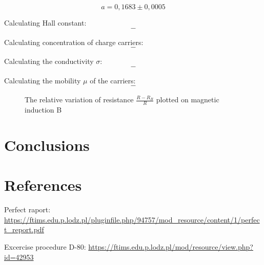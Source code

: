 \documentclass[a4paper,12pt]{article}
\begin{document}
\begin{equation*}
a = 0,1683 \pm 0,0005
\end{equation*}

Calculating Hall constant:
\begin{equation*}
-
\end{equation*}

Calculating concentration of charge carriers:
\begin{equation*}
-
\end{equation*}

Calculating the conductivity $\sigma$:
\begin{equation*}
-
\end{equation*}

Calculating the mobility $\mu$ of the carriers:
\begin{equation*}
-
\end{equation*}

\begin{figure} [H]
\begin{center}
\caption{The relative variation of resistance $\frac{R-R_B}{R}$ plotted on magnetic induction B}
\end{center}
\end{figure}

\section{Conclusions}

\section{References}
\begin{enumerate}[label={[\arabic*]}]
\item Perfect raport: \url{https://ftims.edu.p.lodz.pl/pluginfile.php/94757/mod_resource/content/1/perfect_report.pdf}
\item Excercise procedure D-80: \url{https://ftims.edu.p.lodz.pl/mod/resource/view.php?id=42953}
\end{enumerate}
\end{document}
